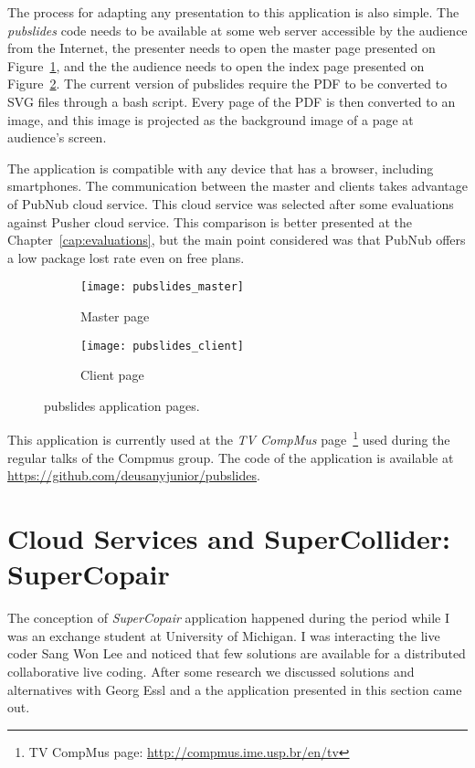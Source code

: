 The process for adapting any presentation to this application is also simple.
The \textit{pubslides} code needs to be available at some web server accessible by the audience from the Internet, the presenter needs to open the master page presented on Figure~\ref{fig:pubslidesmaster}, and the the audience needs to open the index page presented on Figure~\ref{fig:pubslidesclient}.
The current version of pubslides require the PDF to be converted to SVG files through a bash script.
Every page of the PDF is then converted to an image, and this image is projected as the background image of a page at audience's screen.

The application is compatible with any device that has a browser, including smartphones.
The communication between the master and clients takes advantage of PubNub cloud service.
This cloud service was selected after some evaluations against Pusher cloud service.
This comparison is better presented at the Chapter~\ref{cap:evaluations}, but the main point considered was that PubNub offers a low package lost rate even on free plans.

\begin{figure*}[!ht]
\centering
\begin{subfigure}{.45\textwidth}
	\texttt{[image: pubslides\_master]}
    \caption{Master page}
	\label{fig:pubslidesmaster}
\end{subfigure}
\begin{subfigure}{.45\textwidth}
	\texttt{[image: pubslides\_client]}
	\caption{Client page}
	\label{fig:pubslidesclient}
\end{subfigure}

\caption{pubslides application pages.}
\label{fig:pubslidesapplication}
\end{figure*}


This application is currently used at the \textit{TV CompMus} page~\footnote{TV CompMus page: \url{http://compmus.ime.usp.br/en/tv}} used during the regular talks of the Compmus group.
The code of the application is available at \url{https://github.com/deusanyjunior/pubslides}.

\section{Cloud Services and SuperCollider: SuperCopair}
\label{sec:appsupercopair}

The conception of \textit{SuperCopair} application happened during the period while I was an exchange student at University of Michigan.
I was interacting the live coder Sang Won Lee and noticed that few solutions are available for a distributed collaborative live coding.
After some research we discussed solutions and alternatives with Georg Essl and a the application presented in this section came out.

